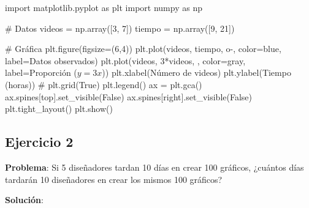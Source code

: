 \documentclass[
  stu,
  floatsintext,
  longtable,
  a4paper,
  nolmodern,
  notxfonts,
  notimes,
  12pt,
  colorlinks=true,linkcolor=blue,citecolor=blue,urlcolor=blue]{apa7}
\newenvironment{Shaded}{\begin{snugshade}}{\end{snugshade}}
\newcommand{\CommentTok}[1]{\textcolor[rgb]{0.37,0.37,0.37}{#1}}
\newcommand{\DecValTok}[1]{\textcolor[rgb]{0.68,0.00,0.00}{#1}}
\newcommand{\ImportTok}[1]{\textcolor[rgb]{0.00,0.46,0.62}{#1}}
\newcommand{\NormalTok}[1]{\textcolor[rgb]{0.00,0.23,0.31}{#1}}
\newcommand{\OperatorTok}[1]{\textcolor[rgb]{0.37,0.37,0.37}{#1}}
\newcommand{\StringTok}[1]{\textcolor[rgb]{0.13,0.47,0.30}{#1}}
\newcommand{\VariableTok}[1]{\textcolor[rgb]{0.07,0.07,0.07}{#1}}
\begin{document}
\begin{Shaded}
\begin{Highlighting}[]
\ImportTok{import}\NormalTok{ matplotlib.pyplot }\ImportTok{as}\NormalTok{ plt}
\ImportTok{import}\NormalTok{ numpy }\ImportTok{as}\NormalTok{ np}

\CommentTok{\# Datos}
\NormalTok{videos }\OperatorTok{=}\NormalTok{ np.array([}\DecValTok{3}\NormalTok{, }\DecValTok{7}\NormalTok{])}
\NormalTok{tiempo }\OperatorTok{=}\NormalTok{ np.array([}\DecValTok{9}\NormalTok{, }\DecValTok{21}\NormalTok{])}

\CommentTok{\# Gráfica}
\NormalTok{plt.figure(figsize}\OperatorTok{=}\NormalTok{(}\DecValTok{6}\NormalTok{,}\DecValTok{4}\NormalTok{))}
\NormalTok{plt.plot(videos, tiempo, }\StringTok{\textquotesingle{}o{-}\textquotesingle{}}\NormalTok{, color}\OperatorTok{=}\StringTok{\textquotesingle{}blue\textquotesingle{}}\NormalTok{, label}\OperatorTok{=}\StringTok{\textquotesingle{}Datos observados\textquotesingle{}}\NormalTok{)}
\NormalTok{plt.plot(videos, }\DecValTok{3}\OperatorTok{*}\NormalTok{videos, }\StringTok{\textquotesingle{}{-}{-}\textquotesingle{}}\NormalTok{, color}\OperatorTok{=}\StringTok{\textquotesingle{}gray\textquotesingle{}}\NormalTok{, label}\OperatorTok{=}\StringTok{\textquotesingle{}Proporción ($y = 3x$)\textquotesingle{}}\NormalTok{)}
\NormalTok{plt.xlabel(}\StringTok{\textquotesingle{}Número de videos\textquotesingle{}}\NormalTok{)}
\NormalTok{plt.ylabel(}\StringTok{\textquotesingle{}Tiempo (horas)\textquotesingle{}}\NormalTok{)}
\CommentTok{\# plt.grid(True)}
\NormalTok{plt.legend()}
\NormalTok{ax }\OperatorTok{=}\NormalTok{ plt.gca()}
\NormalTok{ax.spines[}\StringTok{\textquotesingle{}top\textquotesingle{}}\NormalTok{].set\_visible(}\VariableTok{False}\NormalTok{)}
\NormalTok{ax.spines[}\StringTok{\textquotesingle{}right\textquotesingle{}}\NormalTok{].set\_visible(}\VariableTok{False}\NormalTok{)}
\NormalTok{plt.tight\_layout()}
\NormalTok{plt.show()}
\end{Highlighting}
\end{Shaded}

\subsection{Ejercicio 2}\label{ejercicio-2}

\textbf{Problema}: Si 5 diseñadores tardan 10 días en crear 100
gráficos, ¿cuántos días tardarán 10 diseñadores en crear los mismos 100
gráficos?

\textbf{Solución}:
\end{document}

